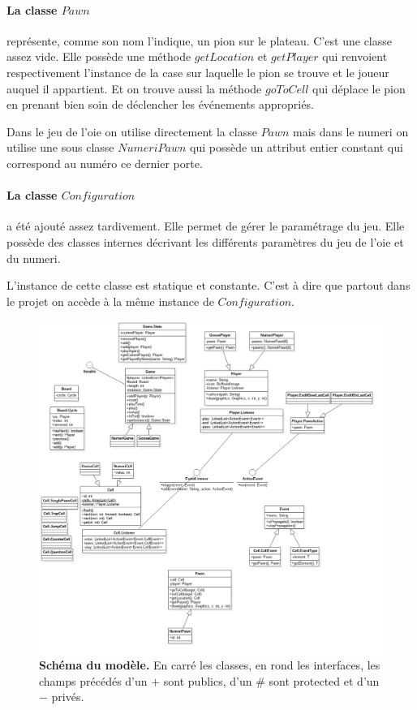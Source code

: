 \documentclass{article}
\begin{document}
\paragraph{La classe $Pawn$} représente, comme son nom l'indique, un pion sur le plateau. C'est une classe assez vide. Elle possède une méthode $getLocation$ et $getPlayer$ qui renvoient respectivement l'instance de la case sur laquelle le pion se trouve et le joueur auquel il appartient. Et on trouve aussi la méthode $goToCell$ qui déplace le pion en prenant bien soin de déclencher les événements appropriés.

Dans le jeu de l'oie on utilise directement la classe $Pawn$ mais dans le numeri on utilise une sous classe $NumeriPawn$ qui possède un attribut entier constant qui correspond au numéro ce dernier porte.

\paragraph{La classe $Configuration$} a été ajouté assez tardivement. Elle permet de gérer le paramétrage du jeu. Elle possède des classes internes décrivant les différents paramètres du jeu de l'oie et du numeri.

L'instance de cette classe est statique et constante. C'est à dire que partout dans le projet on accède à la même instance de $Configuration$.

\begin{figure}
\includegraphics[width=\textwidth]{schema-uml.png}
\caption{
\textbf{Schéma du modèle.}
En carré les classes, en rond les interfaces, les champs précédés d'un $+$ sont publics, d'un $\#$ sont protected et d'un $-$ privés.}
\end{figure}
\end{document}
